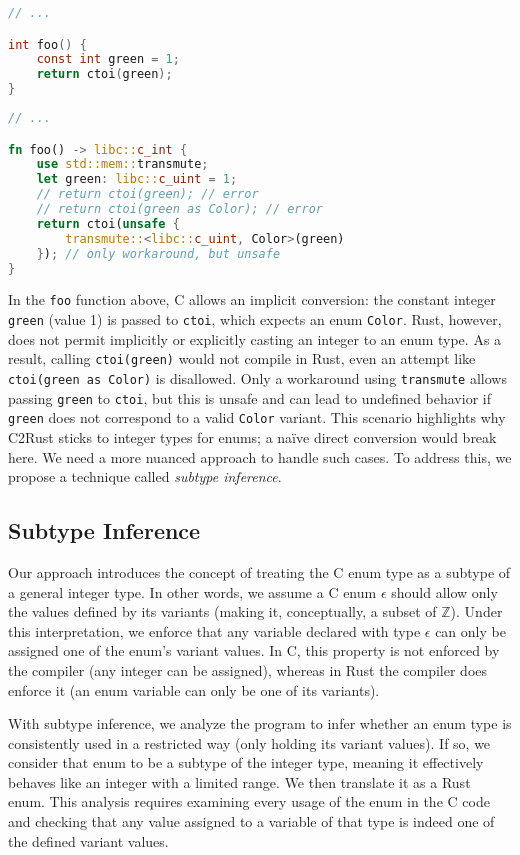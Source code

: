 \documentclass[peerreview, 10pt]{IEEEtran}
\begin{document}
\begin{lstlisting}[language=C, label=lst:example]
// ...

int foo() {
    const int green = 1;
    return ctoi(green);
}
\end{lstlisting}

\begin{lstlisting}[language=Rust]
// ...

fn foo() -> libc::c_int {
    use std::mem::transmute;
    let green: libc::c_uint = 1;
    // return ctoi(green); // error
    // return ctoi(green as Color); // error
    return ctoi(unsafe { 
        transmute::<libc::c_uint, Color>(green) 
    }); // only workaround, but unsafe
}
\end{lstlisting}

In the \texttt{foo} function above, C allows an implicit conversion: the constant integer \texttt{green} (value 1) is passed to \texttt{ctoi}, which expects an enum \texttt{Color}. Rust, however, does not permit implicitly or explicitly casting an integer to an enum type. As a result, calling \texttt{ctoi(green)} would not compile in Rust, even an attempt like \texttt{ctoi(green as Color)} is disallowed. Only a workaround using \texttt{transmute} allows passing \texttt{green} to \texttt{ctoi}, but this is unsafe and can lead to undefined behavior if \texttt{green} does not correspond to a valid \texttt{Color} variant. This scenario highlights why C2Rust sticks to integer types for enums; a na\"ive direct conversion would break here. We need a more nuanced approach to handle such cases. To address this, we propose a technique called \emph{subtype inference}.

\subsection{Subtype Inference}

Our approach introduces the concept of treating the C enum type as a subtype of a general integer type. In other words, we assume a C enum $\epsilon$ should allow only the values defined by its variants (making it, conceptually, a subset of $\mathbb{Z}$). Under this interpretation, we enforce that any variable declared with type $\epsilon$ can only be assigned one of the enum's variant values. In C, this property is not enforced by the compiler (any integer can be assigned), whereas in Rust the compiler does enforce it (an enum variable can only be one of its variants).

With subtype inference, we analyze the program to infer whether an enum type is consistently used in a restricted way (only holding its variant values). If so, we consider that enum to be a subtype of the integer type, meaning it effectively behaves like an integer with a limited range. We then translate it as a Rust enum. This analysis requires examining every usage of the enum in the C code and checking that any value assigned to a variable of that type is indeed one of the defined variant values.
\end{document}
